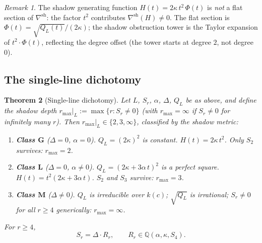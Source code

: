 \documentclass[11pt]{article}
\theoremstyle{plain}
\newtheorem{theorem}{Theorem}[section]
\theoremstyle{definition}
\theoremstyle{remark}
\newtheorem{remark}[theorem]{Remark}
\begin{document}
\begin{remark}
The shadow generating function $H(t) = 2\kappa\,t^2\,\Phi(t)$
is \emph{not} a flat section of $\nabla^{\mathrm{sh}}$: the
factor $t^2$ contributes $\nabla^{\mathrm{sh}}(H) \neq 0$.
The flat section is $\Phi(t) = \sqrt{Q_L(t)}/(2\kappa)$; the
shadow obstruction tower is the Taylor expansion of $t^2 \cdot \Phi(t)$,
reflecting the degree offset (the tower starts at degree $2$,
not degree $0$).
\end{remark}

\subsection{The single-line dichotomy}

\begin{theorem}[Single-line dichotomy]
\label{thm:single-line-dichotomy}
Let $L$, $S_r$, $\alpha$, $\Delta$, $Q_L$ be as above,
and define the shadow depth $r_{\max}|_L := \max\{r : S_r \neq 0\}$
\textup{(}with $r_{\max} = \infty$ if $S_r \neq 0$ for
infinitely many $r$\textup{)}.
Then $r_{\max}|_L \in \{2, 3, \infty\}$, classified by the
shadow metric:
\begin{enumerate}[label=\textup{(\roman*)}]
\item \textbf{Class $\mathbf{G}$}
 \textup{(}$\Delta = 0$, $\alpha = 0$\textup{)}.\enspace
 $Q_L = (2\kappa)^2$ is constant.
 $H(t) = 2\kappa\,t^2$. Only $S_2$ survives: $r_{\max} = 2$.

\item \textbf{Class $\mathbf{L}$}
 \textup{(}$\Delta = 0$, $\alpha \neq 0$\textup{)}.\enspace
 $Q_L = (2\kappa + 3\alpha\,t)^2$ is a perfect square.
 $H(t) = t^2(2\kappa + 3\alpha\,t)$. $S_2$ and $S_3$
 survive: $r_{\max} = 3$.

\item \textbf{Class $\mathbf{M}$}
 \textup{(}$\Delta \neq 0$\textup{)}.\enspace
 $Q_L$ is irreducible over $k(c)$; $\sqrt{Q_L}$ is
 irrational; $S_r \neq 0$ for all $r \geq 4$ generically:
 $r_{\max} = \infty$.
\end{enumerate}
For $r \geq 4$,
\begin{equation}
\label{eq:universal-factorization}
 S_r = \Delta \cdot R_r,
 \qquad R_r \in \mathbb{Q}(\alpha, \kappa, S_4).
\end{equation}
\end{theorem}
\end{document}
